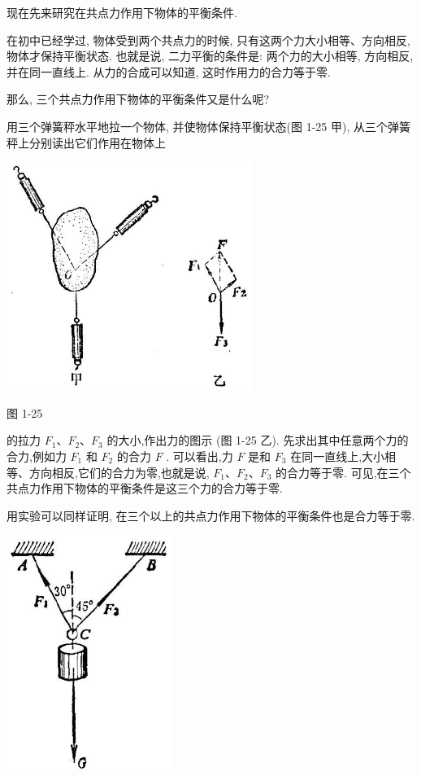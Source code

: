 \documentclass[10pt]{article}
\begin{document}
现在先来研究在共点力作用下物体的平衡条件.

在初中已经学过, 物体受到两个共点力的时候, 只有这两个力大小相等、方向相反, 物体才保持平衡状态. 也就是说, 二力平衡的条件是: 两个力的大小相等, 方向相反, 并在同一直线上. 从力的合成可以知道, 这时作用力的合力等于零.

那么, 三个共点力作用下物体的平衡条件又是什么呢?

用三个弹簧秤水平地拉一个物体, 并使物体保持平衡状态(图 1-25 甲), 从三个弹簧秤上分别读出它们作用在物体上

\begin{center}
\includegraphics[max width=0.6\textwidth]{images/01912d55-147c-70aa-b0e0-1782a122f948_38_350265.jpg}
\end{center}

图 1-25

的拉力 \({F}_{1}\text{、}{F}_{2}\text{、}{F}_{3}\) 的大小,作出力的图示 (图 1-25 乙). 先求出其中任意两个力的合力,例如力 \({F}_{1}\) 和 \({F}_{2}\) 的合力 \(F\) . 可以看出,力 \(F\) 是和 \({F}_{3}\) 在同一直线上,大小相等、方向相反,它们的合力为零,也就是说, \({F}_{1}\text{、}{F}_{2}\text{、}{F}_{3}\) 的合力等于零. 可见,在三个共点力作用下物体的平衡条件是这三个力的合力等于零.

用实验可以同样证明, 在三个以上的共点力作用下物体的平衡条件也是合力等于零.

\begin{center}
\includegraphics[max width=0.4\textwidth]{images/01912d55-147c-70aa-b0e0-1782a122f948_39_984528.jpg}
\end{center}
\end{document}
